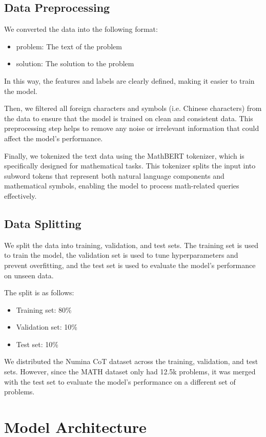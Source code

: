 \documentclass{article}
\begin{document}
\subsection{Data Preprocessing}

We converted the data into the following format:
\begin{itemize}
  \item problem: The text of the problem
  \item solution: The solution to the problem
\end{itemize}

In this way, the features and labels are clearly defined, making it easier to train the model. 

Then, we filtered all foreign characters and symbols (i.e. Chinese characters) from the data to ensure that the model is trained on clean and consistent data. This preprocessing step helps to remove any noise or irrelevant information that could affect the model's performance.

Finally, we tokenized the text data using the MathBERT tokenizer, which is specifically designed for mathematical tasks. This tokenizer splits the input into subword tokens that represent both natural language components and mathematical symbols, enabling the model to process math-related queries effectively.

\subsection{Data Splitting}
We split the data into training, validation, and test sets. The training set is used to train the model, the validation set is used to tune hyperparameters and prevent overfitting, and the test set is used to evaluate the model's performance on unseen data.

The split is as follows:
\begin{itemize}
  \item Training set: 80\%
  \item Validation set: 10\%
  \item Test set: 10\%
\end{itemize}

We distributed the Numina CoT dataset across the training, validation, and test sets. However, since the MATH dataset only had 12.5k problems, it was merged with the test set to evaluate the model's performance on a different set of problems.

\section{Model Architecture}
\end{document}
